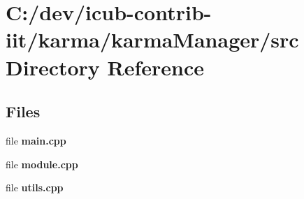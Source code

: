 \section{C\+:/dev/icub-\/contrib-\/iit/karma/karma\+Manager/src Directory Reference}
\label{dir_f4e1b1ef93941e35f62538df412b6f8f}
\subsection*{Files}
\begin{DoxyCompactItemize}
\item 
file {\bfseries main.\+cpp}
\item 
file {\bfseries module.\+cpp}
\item 
file {\bfseries utils.\+cpp}
\end{DoxyCompactItemize}
